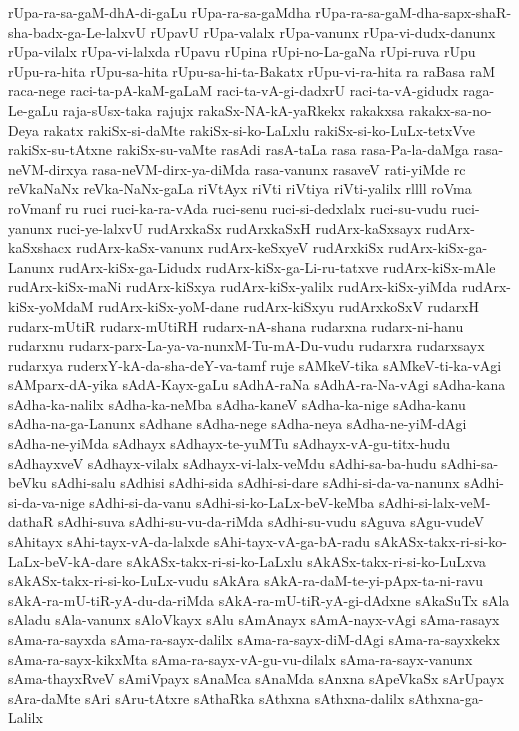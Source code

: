 {rUpa-ra-sa-gaM-dhA-di-gaLu
rUpa-ra-sa-gaMdha
rUpa-ra-sa-gaM-dha-sapx-shaR-sha-badx-ga-Le-lalxvU
rUpavU
rUpa-valalx
rUpa-vanunx
rUpa-vi-dudx-danunx
rUpa-vilalx
rUpa-vi-lalxda
rUpavu
rUpina
rUpi-no-La-gaNa
rUpi-ruva
rUpu
rUpu-ra-hita
rUpu-sa-hita
rUpu-sa-hi-ta-Bakatx
rUpu-vi-ra-hita
ra
raBasa
raM
raca-nege
raci-ta-pA-kaM-gaLaM
raci-ta-vA-gi-dadxrU
raci-ta-vA-gidudx
raga-Le-gaLu
raja-sUsx-taka
rajujx
rakaSx-NA-kA-yaRkekx
rakakxsa
rakakx-sa-no-Deya
rakatx
rakiSx-si-daMte
rakiSx-si-ko-LaLxlu
rakiSx-si-ko-LuLx-tetxVve
rakiSx-su-tAtxne
rakiSx-su-vaMte
rasAdi
rasA-taLa
rasa
rasa-Pa-la-daMga
rasa-neVM-dirxya
rasa-neVM-dirx-ya-diMda
rasa-vanunx
rasaveV
rati-yiMde
rc
reVkaNaNx
reVka-NaNx-gaLa
riVtAyx
riVti
riVtiya
riVti-yalilx
rllll
roVma
roVmanf
ru
ruci
ruci-ka-ra-vAda
ruci-senu
ruci-si-dedxlalx
ruci-su-vudu
ruci-yanunx
ruci-ye-lalxvU
rudArxkaSx
rudArxkaSxH
rudArx-kaSxsayx
rudArx-kaSxshacx
rudArx-kaSx-vanunx
rudArx-keSxyeV
rudArxkiSx
rudArx-kiSx-ga-Lanunx
rudArx-kiSx-ga-Lidudx
rudArx-kiSx-ga-Li-ru-tatxve
rudArx-kiSx-mAle
rudArx-kiSx-maNi
rudArx-kiSxya
rudArx-kiSx-yalilx
rudArx-kiSx-yiMda
rudArx-kiSx-yoMdaM
rudArx-kiSx-yoM-dane
rudArx-kiSxyu
rudArxkoSxV
rudarxH
rudarx-mUtiR
rudarx-mUtiRH
rudarx-nA-shana
rudarxna
rudarx-ni-hanu
rudarxnu
rudarx-parx-La-ya-va-nunxM-Tu-mA-Du-vudu
rudarxra
rudarxsayx
rudarxya
ruderxY-kA-da-sha-deY-va-tamf
ruje
sAMkeV-tika
sAMkeV-ti-ka-vAgi
sAMparx-dA-yika
sAdA-Kayx-gaLu
sAdhA-raNa
sAdhA-ra-Na-vAgi
sAdha-kana
sAdha-ka-nalilx
sAdha-ka-neMba
sAdha-kaneV
sAdha-ka-nige
sAdha-kanu
sAdha-na-ga-Lanunx
sAdhane
sAdha-nege
sAdha-neya
sAdha-ne-yiM-dAgi
sAdha-ne-yiMda
sAdhayx
sAdhayx-te-yuMTu
sAdhayx-vA-gu-titx-hudu
sAdhayxveV
sAdhayx-vilalx
sAdhayx-vi-lalx-veMdu
sAdhi-sa-ba-hudu
sAdhi-sa-beVku
sAdhi-salu
sAdhisi
sAdhi-sida
sAdhi-si-dare
sAdhi-si-da-va-nanunx
sAdhi-si-da-va-nige
sAdhi-si-da-vanu
sAdhi-si-ko-LaLx-beV-keMba
sAdhi-si-lalx-veM-dathaR
sAdhi-suva
sAdhi-su-vu-da-riMda
sAdhi-su-vudu
sAguva
sAgu-vudeV
sAhitayx
sAhi-tayx-vA-da-lalxde
sAhi-tayx-vA-ga-bA-radu
sAkASx-takx-ri-si-ko-LaLx-beV-kA-dare
sAkASx-takx-ri-si-ko-LaLxlu
sAkASx-takx-ri-si-ko-LuLxva
sAkASx-takx-ri-si-ko-LuLx-vudu
sAkAra
sAkA-ra-daM-te-yi-pApx-ta-ni-ravu
sAkA-ra-mU-tiR-yA-du-da-riMda
sAkA-ra-mU-tiR-yA-gi-dAdxne
sAkaSuTx
sAla
sAladu
sAla-vanunx
sAloVkayx
sAlu
sAmAnayx
sAmA-nayx-vAgi
sAma-rasayx
sAma-ra-sayxda
sAma-ra-sayx-dalilx
sAma-ra-sayx-diM-dAgi
sAma-ra-sayxkekx
sAma-ra-sayx-kikxMta
sAma-ra-sayx-vA-gu-vu-dilalx
sAma-ra-sayx-vanunx
sAma-thayxRveV
sAmiVpayx
sAnaMca
sAnaMda
sAnxna
sApeVkaSx
sArUpayx
sAra-daMte
sAri
sAru-tAtxre
sAthaRka
sAthxna
sAthxna-dalilx
sAthxna-ga-Lalilx
}
